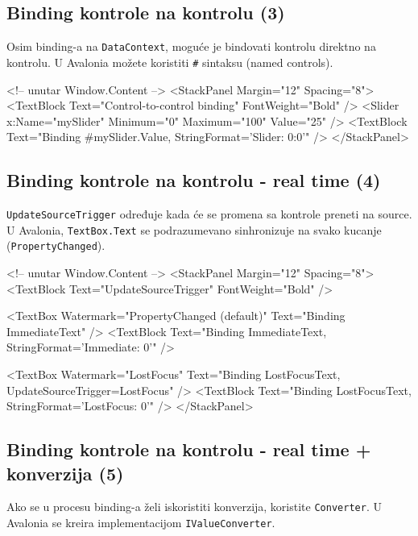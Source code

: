 \documentclass[11pt,a4paper]{article}
\begin{document}
\subsection{Binding kontrole na kontrolu (3)}
Osim binding-a na \texttt{DataContext}, moguće je bindovati kontrolu direktno na kontrolu. U Avalonia možete koristiti \texttt{\#} sintaksu (named controls).

\begin{CodeBlock}
<!-- unutar Window.Content -->
<StackPanel Margin="12" Spacing="8">
  <TextBlock Text="Control-to-control binding" FontWeight="Bold" />
  <Slider x:Name="mySlider" Minimum="0" Maximum="100" Value="25" />
  <TextBlock Text="{Binding #mySlider.Value, StringFormat='Slider: {0:0}'}" />
</StackPanel>
\end{CodeBlock}

\subsection{Binding kontrole na kontrolu - real time (4)}
\texttt{UpdateSourceTrigger} određuje kada će se promena sa kontrole preneti na source. U Avalonia, \texttt{TextBox.Text} se podrazumevano sinhronizuje na svako kucanje (\texttt{PropertyChanged}).

\begin{CodeBlock}
<!-- unutar Window.Content -->
<StackPanel Margin="12" Spacing="8">
  <TextBlock Text="UpdateSourceTrigger" FontWeight="Bold" />

  <TextBox Watermark="PropertyChanged (default)" Text="{Binding ImmediateText}" />
  <TextBlock Text="{Binding ImmediateText, StringFormat='Immediate: {0}'}" />

  <TextBox Watermark="LostFocus" Text="{Binding LostFocusText, UpdateSourceTrigger=LostFocus}" />
  <TextBlock Text="{Binding LostFocusText, StringFormat='LostFocus: {0}'}" />
</StackPanel>
\end{CodeBlock}

\subsection{Binding kontrole na kontrolu - real time + konverzija (5)}
Ako se u procesu binding-a želi iskoristiti konverzija, koristite \texttt{Converter}. U Avalonia se kreira implementacijom \texttt{IValueConverter}.
\end{document}
